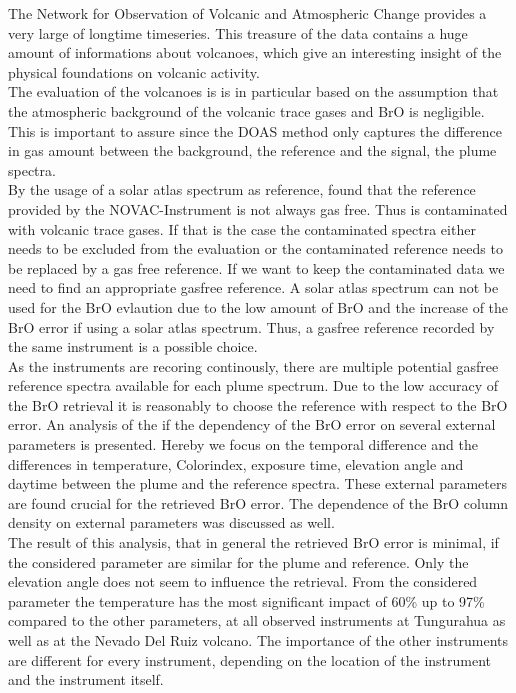 \documentclass  [
  paper    = a4,
  BCOR     = 10mm,
  twoside,
  fontsize = 12pt,
  fleqn,
  toc      = bibnumbered,
  toc      = listofnumbered,
  numbers  = noendperiod,
  headings = normal,
  listof   = leveldown,
  version  = 3.03
]                                       {scrreprt}
\begin{document}
	The Network for Observation of Volcanic and Atmospheric Change provides a very large of longtime timeseries. This treasure of the data contains a huge amount of informations about volcanoes, which give an interesting insight of the physical foundations on volcanic activity.\\
	The evaluation of the volcanoes is is in particular based on the assumption that the atmospheric background of the volcanic trace gases  and BrO is negligible. This is important to assure since the DOAS method only captures the difference in gas amount between the background, the reference and the signal, the plume spectra.\\
	By the usage of a solar atlas spectrum as reference, \citet{lubcke2014bro} found  that the reference provided by the NOVAC-Instrument is not always gas free. Thus is contaminated with volcanic trace gases. If that is the case the contaminated spectra either needs to be excluded from the evaluation or the contaminated reference needs to be replaced by a gas free reference. If we want to keep the contaminated data we need to find an appropriate gasfree reference. A solar atlas spectrum can not be used for the BrO evlaution due to the low amount of BrO and the increase of the BrO error if using a solar atlas spectrum. Thus, a gasfree reference recorded by the same instrument is a possible choice.\\
	As the instruments are recoring continously, there are multiple potential gasfree reference spectra available for each plume spectrum. Due to the low accuracy of the BrO retrieval it is reasonably to choose the reference with respect to the BrO error.
	An analysis of the if the dependency of the BrO error on several external parameters is presented. Hereby we focus on the temporal difference and the differences in temperature, Colorindex, exposure time, elevation angle and daytime between the plume and the reference spectra. These external parameters are found crucial for the retrieved BrO error. The dependence of the BrO column density on external parameters was discussed as well. 
	\\
	The result of this analysis, that in general the retrieved BrO error is minimal, if the considered parameter are similar for the plume and reference. Only the elevation angle does not seem to influence the retrieval. From the considered parameter the temperature has the most significant impact of 60\% up to 97\% compared to the other parameters, at all observed instruments at Tungurahua as well as at the Nevado Del Ruiz volcano. The importance of the other instruments are different for every instrument, depending on the location of the instrument and the instrument itself.\\
\end{document}
